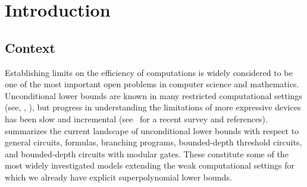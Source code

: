 \documentclass{toc}
\begin{document}
\section{Introduction}

\subsection{Context}

Establishing limits on the efficiency of computations is widely considered to be one of the most important open problems in computer science and mathematics. Unconditional lower bounds are known in many restricted computational settings (see, \eg, \cite{DBLP:books/el/leeuwen90/BoppanaS90, DBLP:books/daglib/0028687}), but progress in understanding the limitations of more expressive devices has been slow and incremental (see~\cite{DBLP:journals/eccc/Aaronson17} for a recent survey and references).  summarizes the current landscape of unconditional lower bounds with respect to general circuits, formulas, branching programs, bounded-depth threshold circuits, and bounded-depth circuits with modular gates. These constitute some of the most widely investigated models extending the weak computational settings for which we already have explicit superpolynomial lower bounds.\\

\vspace{-0.2cm}
\end{document}
